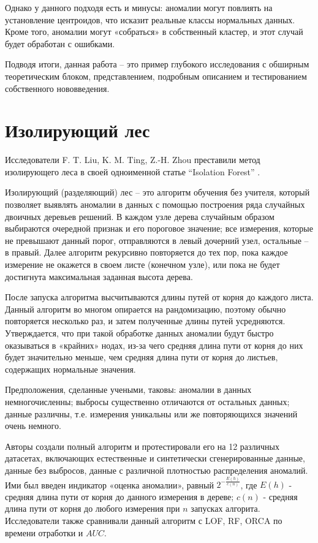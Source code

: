 \documentclass[14pt, letterpaper]{extarticle}
\begin{document}
Однако у данного подходя есть и минусы: аномалии могут повлиять на установление центроидов, что исказит реальные классы нормальных данных. Кроме того, аномалии могут «собраться» в собственный кластер, и этот случай будет обработан с ошибками.

Подводя итоги, данная работа – это пример глубокого исследования с обширным теоретическим блоком, представлением, подробным описанием и тестированием собственного нововведения.

\section{Изолирующий лес}

Исследователи F. T. Liu, K. M. Ting, Z.-H. Zhou преставили метод изолирующего леса в своей одноименной статье “Isolation Forest” \cite{liu2008isolation}. 

Изолирующий (разделяющий) лес – это алгоритм обучения без учителя, который позволяет выявлять аномалии в данных с помощью построения ряда случайных двоичных деревьев решений. В каждом узле дерева случайным образом выбираются очередной признак и его пороговое значение; все измерения, которые не превышают данный порог, отправляются в левый дочерний узел, остальные – в правый. Далее алгоритм рекурсивно повторяется до тех пор, пока каждое измерение не окажется в своем листе (конечном узле), или пока не будет достигнута максимальная заданная высота дерева. 

После запуска алгоритма высчитываются длины путей от корня до каждого листа. Данный алгоритм во многом опирается на рандомизацию, поэтому обычно повторяется несколько раз, и затем полученные длины путей усредняются. Утверждается, что при такой обработке данных аномалии будут быстро оказываться в «крайних» нодах, из-за чего средняя длина пути от корня до них будет значительно меньше, чем средняя длина пути от корня до листьев, содержащих нормальные значения. 

Предположения, сделанные учеными, таковы: аномалии в данных немногочисленны; выбросы существенно отличаются от остальных данных; данные различны, т.е. измерения уникальны или же повторяющихся значений очень немного.
 
Авторы создали полный алгоритм и протестировали его на 12 различных датасетах, включающих естественные и синтетически сгенерированные данные, данные без выбросов, данные с различной плотностью распределения аномалий. Ими был введен индикатор «оценка аномалии», равный $2^{-\frac{E(h)}{c(n)}}$, где $E(h)$ - средняя длина пути от корня до данного измерения в дереве; $c(n)$ - средняя длина пути от корня до любого измерения при $n$ запусках алгорита. Исследователи также сравнивали данный алгоритм с LOF, RF, ORCA по времени отработки и $AUC$. 
\end{document}
